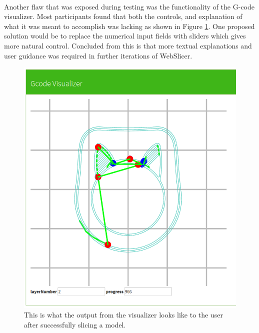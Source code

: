 \paragraph{}
Another flaw that was exposed during testing was the functionality of the G-code visualizer.
Most participants found that both the controls, and explanation of what it was meant to accomplish was lacking as shown in Figure \ref{fig:visualizer}.
One proposed solution would be to replace the numerical input fields with sliders which gives more natural control.
Concluded from this is that more textual explanations and user guidance was required in further iterations of WebSlicer.

\begin{figure}[!ht]
  \centering
  \includegraphics[width=\linewidth]{images/visualizer.png}
  \caption{This is what the output from the visualizer looks like to the user after successfully slicing a model.}
  \label{fig:visualizer}
\end{figure}


